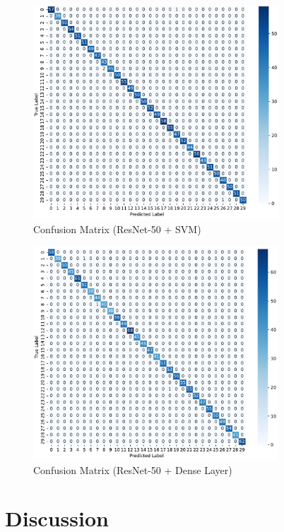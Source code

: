 \begin{figure}[H]
\centering
\includegraphics[height=8cm]{./fig/confusion_matrix.pdf} 
\centering
\caption{Confusion Matrix (ResNet-50 + SVM)}
\label{Confusion_matrix_svm}
\end{figure}

\begin{figure}[H]
\centering
\includegraphics[height=8cm]{./fig/confusion_matrix_2.pdf} 
\centering
\caption{Confusion Matrix (ResNet-50 + Dense Layer)}
\label{Confusion_matrix_dense}
\end{figure}

\newpage
\section{Discussion}
\label{sec:sec4_4_5}